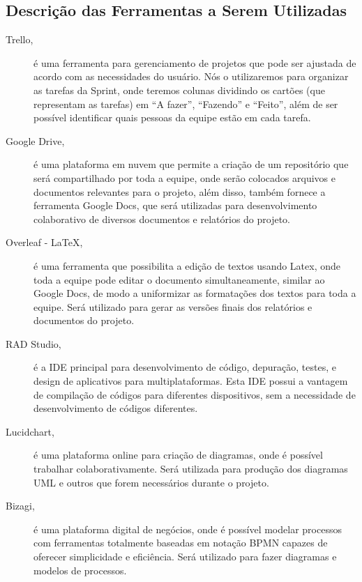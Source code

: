 \documentclass[12pt]{article}
\begin{document}
\subsection{Descrição das Ferramentas a Serem Utilizadas}
\begin{description}
\item[Trello,] é uma ferramenta para gerenciamento de projetos que pode ser ajustada de acordo com as necessidades do usuário. Nós o utilizaremos para organizar as tarefas da Sprint, onde teremos colunas dividindo os cartões (que representam as tarefas) em “A fazer”, “Fazendo” e “Feito”, além de ser possível identificar quais pessoas da equipe estão em cada tarefa.
\\
\item[Google Drive,] é uma plataforma em nuvem que permite a criação de um repositório que será compartilhado por toda a equipe, onde serão colocados arquivos e documentos relevantes para o projeto, além disso, também fornece a ferramenta Google Docs, que será utilizadas para desenvolvimento colaborativo de diversos documentos e relatórios do projeto.
\newline
\item[Overleaf - LaTeX,] é uma ferramenta que possibilita a edição de textos usando Latex, onde toda a equipe pode editar o documento simultaneamente, similar ao Google Docs, de modo a uniformizar as formatações dos textos para toda a equipe. Será utilizado para gerar as versões finais dos relatórios e documentos do projeto.
\newline
\item[RAD Studio,] é a IDE principal para desenvolvimento de código, depuração, testes, e design de aplicativos para multiplataformas. Esta IDE possui a vantagem de compilação de códigos para diferentes dispositivos, sem a necessidade de desenvolvimento de códigos diferentes.
\newline
\item[Lucidchart,] é uma plataforma online para criação de diagramas, onde é possível trabalhar colaborativamente. Será utilizada para produção dos diagramas UML e outros que forem necessários durante o projeto.
\newline
\item[Bizagi,]  é uma plataforma digital de negócios, onde é possível modelar processos com ferramentas totalmente baseadas em notação BPMN capazes de oferecer simplicidade e eficiência. Será utilizado para fazer diagramas e modelos de processos.
\newline

\end{description}
\end{document}
